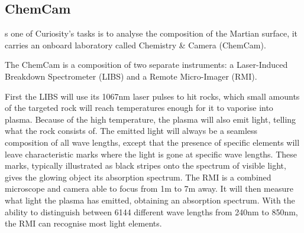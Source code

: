 \subsection*{ChemCam}
s one of Curiosity's tasks is to analyse the composition of the Martian surface, it carries an onboard laboratory called Chemistry \& Camera (ChemCam).

The ChemCam is a composition of two separate instruments: a Laser-Induced Breakdown Spectrometer (LIBS) and a Remote Micro-Imager (RMI).

First the LIBS will use its 1067nm laser pulses to hit rocks, which small amounts of the targeted rock will reach temperatures enough for it to vaporise into plasma.
Because of the high temperature, the plasma will also emit light, telling what the rock consists of.
The emitted light will always be a seamless composition of all wave lengths, except that the presence of specific elements will leave characteristic marks where the light is gone at specific wave lengths.
These marks, typically illustrated as black stripes onto the spectrum of visible light, gives the glowing object its absorption spectrum.
The RMI is a combined microscope and camera able to focus from 1m to 7m away.
It will then measure what light the plasma has emitted, obtaining an absorption spectrum.
With the ability to distinguish between 6144 different wave lengths from 240nm to 850nm, the RMI can recognise most light elements. \cite{ChemCam}